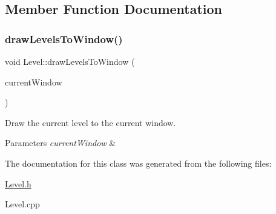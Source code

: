 \subsection{Member Function Documentation}
\mbox{\label{class_level_a4cdf43966bbd49ea4f392762c4cd7991}} 
\subsubsection{\texorpdfstring{draw\+Levels\+To\+Window()}{drawLevelsToWindow()}}
{\footnotesize\ttfamily void Level\+::draw\+Levels\+To\+Window (\begin{DoxyParamCaption}\item[{sf\+::\+Render\+Window $\ast$}]{current\+Window }\end{DoxyParamCaption})}



Draw the current level to the current window. 


\begin{DoxyParams}{Parameters}
{\em current\+Window} & \\
\hline
\end{DoxyParams}


The documentation for this class was generated from the following files\+:\begin{DoxyCompactItemize}
\item 
\hyperlink{_level_8h}{Level.\+h}\item 
Level.\+cpp\end{DoxyCompactItemize}

